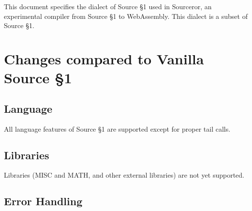 

\newcommand{\Rule}[2]{\genfrac{}{}{0.7pt}{}{{\setlength{\fboxrule}{0pt}\setlength{\fboxsep}{3mm}\fbox{$#1$}}}{{\setlength{\fboxrule}{0pt}\setlength{\fboxsep}{3mm}\fbox{$#2$}}}}

\newcommand{\TruE}{\textbf{\texttt{true}}}
\newcommand{\FalsE}{\textbf{\texttt{false}}}
\newcommand{\Rc}{\texttt{\}}}
\newcommand{\Lc}{\texttt{\{}}
\newcommand{\Rp}{\texttt{)}}
\newcommand{\Lp}{\texttt{(}}
\newcommand{\Fun}{\textbf{\texttt{function}}}
\newcommand{\Let}{\textbf{\texttt{let}}}
\newcommand{\Return}{\textbf{\texttt{return}}}
\newcommand{\Const}{\textbf{\texttt{const}}}
\newcommand{\If}{\textbf{\texttt{if}}}
\newcommand{\Else}{\textbf{\texttt{else}}}
\newcommand{\Bool}{\texttt{bool}}
\newcommand{\Number}{\texttt{number}}
\newcommand{\String}{\texttt{string}}
\newcommand{\Undefined}{\texttt{undefined}}

\newtheorem{definition}{Definition}[section]



This document specifies the dialect of Source \S 1 used in Sourceror, an experimental compiler from Source \S 1 to WebAssembly.  This dialect is a subset of Source \S 1.

\section{Changes compared to Vanilla Source \S 1}

\subsection*{Language}  

All language features of Source \S 1 are supported except for proper tail calls.

\subsection*{Libraries}

Libraries (MISC and MATH, and other external libraries) are not yet supported.

\subsection*{Error Handling}

